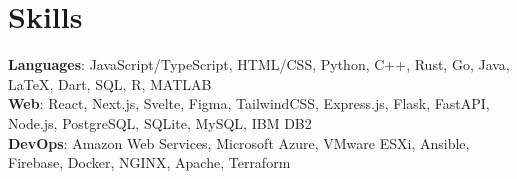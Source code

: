 \documentclass{article}
\begin{document}
\section*{Skills}
\textbf{Languages}: JavaScript/TypeScript, HTML/CSS, Python, C++, Rust, Go, Java, {\selectfont\LaTeX}, Dart, SQL, R, MATLAB\\
\textbf{Web}: React, Next.js, Svelte, Figma, TailwindCSS, Express.js, Flask, FastAPI, Node.js, PostgreSQL, SQLite, MySQL, IBM DB2\\
\textbf{DevOps}: Amazon Web Services, Microsoft Azure, VMware ESXi, Ansible, Firebase, Docker, NGINX, Apache, Terraform\\
\end{document}
